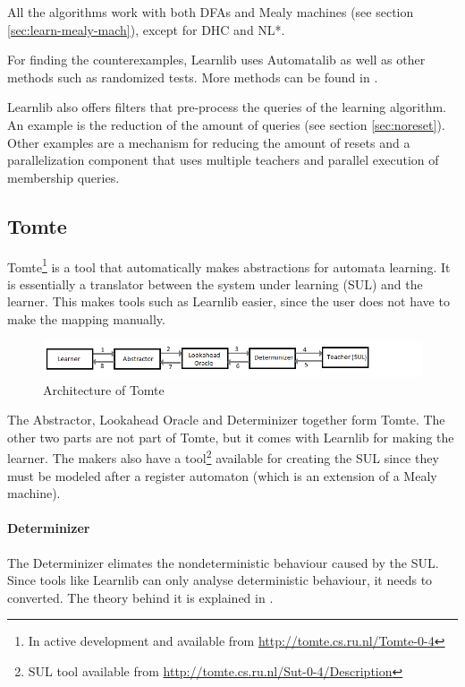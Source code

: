 \documentclass[multi,crop=false,class=article]{standalone}
\begin{document}
All the algorithms work with both DFAs and Mealy machines (see section 
\ref{sec:learn-mealy-mach}), except for DHC\cite{Merten2012} and 
NL*\cite{Bollig2009}.

For finding the counterexamples, Learnlib uses Automatalib as well as other
methods such as randomized tests. More methods can be found in 
\cite[p. 490]{Isberner2015b}.

Learnlib also offers filters that pre-process the queries of the learning 
algorithm. An example is the reduction of the amount of queries (see section 
\ref{sec:noreset}). Other examples are a mechanism for reducing the amount of 
resets  and a parallelization component that uses multiple teachers and 
parallel execution of membership queries\cite{Henrix2015,Howar2012}.     


\subsection{Tomte}
\label{ssec:tomte}
Tomte\footnote{In active development and available from
\url{http://tomte.cs.ru.nl/Tomte-0-4}} is a tool that automatically makes
abstractions for automata learning. It is essentially a translator between the
system under learning (SUL) and the learner. This makes tools such as Learnlib 
easier, since the user does not have to make the mapping manually.

\begin{figure}[!ht]
	\includegraphics[width=\textwidth]{Tool_images/tomte_network.png}
	\caption{Architecture of Tomte}
	\label{fig:tomte_arch_interaction}
\end{figure}

The Abstractor, Lookahead Oracle and Determinizer together form Tomte. The
other two parts are not part of Tomte, but it comes with Learnlib for making 
the learner. The makers also have a tool\footnote{SUL tool available from 
\url{http://tomte.cs.ru.nl/Sut-0-4/Description}} available for creating the SUL 
since they must be modeled after a register automaton\cite{Aarts2015} 
(which is an extension of a Mealy machine).

\paragraph{Determinizer} The Determinizer elimates the nondeterministic
behaviour caused by the SUL. Since tools like Learnlib can only analyse
deterministic behaviour, it needs to converted. The theory behind it is
explained in \cite[p. 172]{Aarts2015}.
\end{document}
